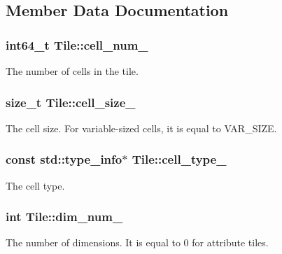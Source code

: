 \subsection{Member Data Documentation}
\hypertarget{classTile_a86e62b41be7955d73118fdc703ab84e5}{}
\subsubsection[{cell\+\_\+num\+\_\+}]{\setlength{\rightskip}{0pt plus 5cm}int64\+\_\+t Tile\+::cell\+\_\+num\+\_\+\hspace{0.3cm}{\ttfamily [private]}}\label{classTile_a86e62b41be7955d73118fdc703ab84e5}
The number of cells in the tile. \hypertarget{classTile_ae2cfbaf3e994027273c5ef0e73ed72f2}{}
\subsubsection[{cell\+\_\+size\+\_\+}]{\setlength{\rightskip}{0pt plus 5cm}size\+\_\+t Tile\+::cell\+\_\+size\+\_\+\hspace{0.3cm}{\ttfamily [private]}}\label{classTile_ae2cfbaf3e994027273c5ef0e73ed72f2}
The cell size. For variable-\/sized cells, it is equal to V\+A\+R\+\_\+\+S\+I\+Z\+E. \hypertarget{classTile_a9834351c4f87c33494c6938725285501}{}
\subsubsection[{cell\+\_\+type\+\_\+}]{\setlength{\rightskip}{0pt plus 5cm}const std\+::type\+\_\+info$\ast$ Tile\+::cell\+\_\+type\+\_\+\hspace{0.3cm}{\ttfamily [private]}}\label{classTile_a9834351c4f87c33494c6938725285501}
The cell type. \hypertarget{classTile_af1cc5abe87729af6774e2f15aac6f109}{}
\subsubsection[{dim\+\_\+num\+\_\+}]{\setlength{\rightskip}{0pt plus 5cm}int Tile\+::dim\+\_\+num\+\_\+\hspace{0.3cm}{\ttfamily [private]}}\label{classTile_af1cc5abe87729af6774e2f15aac6f109}
The number of dimensions. It is equal to 0 for attribute tiles. \hypertarget{classTile_ab2ff00cb42ae4699447681611c1765f4}{}
